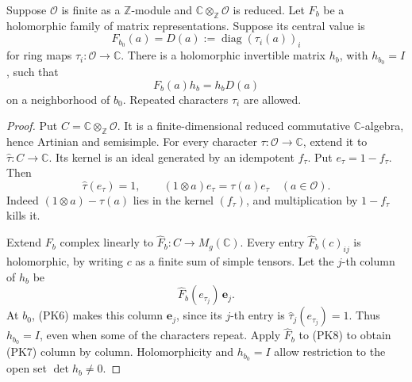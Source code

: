 \begin{srlemma}
\label{lem:ftb-holomorphic-diagonalization}
Suppose \(\mathcal O\) is finite as a \(\mathbb Z\)-module
and \(\mathbb C\otimes_{\mathbb Z}\mathcal O\) is reduced.
Let \(F_b\) be a holomorphic family of matrix representations.
Suppose its central value is
\[
                        F_{b_0}(a)=D(a)
                           :=\operatorname{diag}(\tau_i(a))_i
                                                               \tag{PK6}
\]
for ring maps \(\tau_i:\mathcal O\to\mathbb C\).
There is a holomorphic invertible matrix \(h_b\), with
\(h_{b_0}=I\), such that
\[
                               F_b(a)h_b=h_bD(a)             \tag{PK7}
\]
on a neighborhood of \(b_0\).
Repeated characters \(\tau_i\) are allowed.
\end{srlemma}
\begin{proof}
Put \(C=\mathbb C\otimes_{\mathbb Z}\mathcal O\).
It is a finite-dimensional reduced commutative
\(\mathbb C\)-algebra, hence Artinian and semisimple.
For every character \(\tau:\mathcal O\to\mathbb C\),
extend it to \(\widehat\tau:C\to\mathbb C\).
Its kernel is an ideal generated by an idempotent \(f_\tau\).
Put \(e_\tau=1-f_\tau\).
Then
\[
 \widehat\tau(e_\tau)=1,\qquad
              (1\otimes a)e_\tau=\tau(a)e_\tau
                                    \quad(a\in\mathcal O). \tag{PK8}
\]
Indeed \((1\otimes a)-\tau(a)\) lies in the kernel
\((f_\tau)\), and multiplication by \(1-f_\tau\) kills it.

Extend \(F_b\) complex linearly to \(\widehat F_b:C\to M_g(\mathbb C)\).
Every entry \(\widehat F_b(c)_{ij}\) is holomorphic,
by writing \(c\) as a finite sum of simple tensors.
Let the \(j\)-th column of \(h_b\) be
\[
                              \widehat F_b(e_{\tau_j})\,\mathbf e_j.
\]
At \(b_0\), (PK6) makes this column \(\mathbf e_j\),
since its \(j\)-th entry is
\(\widehat\tau_j(e_{\tau_j})=1\).
Thus \(h_{b_0}=I\), even when some of the characters repeat.
Apply \(\widehat F_b\) to (PK8) to obtain (PK7)
column by column.
Holomorphicity and \(h_{b_0}=I\) allow restriction to the
open set \(\det h_b\ne0\).
\end{proof}


